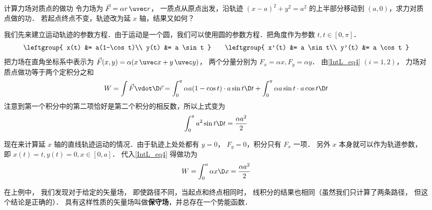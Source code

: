 \begin{exam}{计算力场对质点的做功}\label{IntL_ex1}
令力场为 $\vec F = \alpha r \,\uvec r$， 一质点从原点出发，沿轨迹 $(x-a)^2 + y^2 = a^2$ 的上半部分移动到 $(a,0)$，求力对质点做的功． 若起点终点不变，轨迹改为延 $x$ 轴，结果又如何？

我们先来建立运动轨迹的参数方程．由于运动是一个圆，我们可以使用圆的参数方程．把角度作为参数 $t, t\in [0,\pi]$．
\begin{equation}
\leftgroup{
x(t) &= a(1-\cos t)\\
y(t) &= a \sin t
}
\qquad 
\leftgroup{
x'(t) &= a \sin t\\
y'(t) &= a \cos t
}
\end{equation}
把力场在直角坐标系中表示为 $\vec F(x,y) = \alpha (x\,\uvec x + y\,\uvec y)$， 两个分量分别为 $F_x = \alpha x, F_y = \alpha y$． 由\autoref{IntL_eq4} $(i=1,2)$， 力场对质点做功等于两个定积分之和
\begin{equation}
W = \int \vec F \vdot \D \vec r =\int_0^\pi \alpha a(1-\cos t) \cdot a \sin t \D t + \int_0^\pi \alpha a \sin t \cdot a \cos t \D t
\end{equation}
注意到第一个积分中的第二项恰好是第二个积分的相反数，所以上式变为
\begin{equation}
\int_0^\pi a^2 \sin t \D t = \frac{\alpha a^2}{2}
\end{equation}

现在来计算延 $x$ 轴的直线轨迹运动的情况．由于轨迹上处处都有 $y=0$， $F_y = 0$，积分只有 $F_x$ 一项． 另外 $x$ 本身就可以作为轨道参数，即 $x(t) = t, y(t) = 0, x\in [0,a]$． 代入\autoref{IntL_eq4} 得做功为
\begin{equation}
W = \int_0^a \alpha x \D x = \frac{\alpha a^2}{2}
\end{equation}
\end{exam}

在上例中， 我们发现对于给定的矢量场， 即使路径不同，当起点和终点相同时， 线积分的结果也相同（虽然我们只计算了两条路径， 但这个结论是正确的）． 具有这样性质的矢量场叫做\textbf{保守场}，并总存在一个势能函数． 




